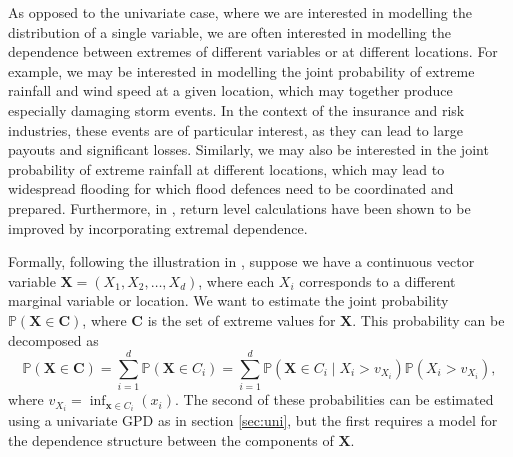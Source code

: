 \documentclass{article}
\numberwithin{equation}{section}
\begin{document}

As opposed to the univariate case, where we are interested in modelling the distribution of a single variable, we are often interested in modelling the dependence between extremes of different variables or at different locations.
For example, we may be interested in modelling the joint probability of extreme rainfall and wind speed at a given location, which may together produce especially damaging storm events.
In the context of the insurance and risk industries, these events are of particular interest, as they can lead to large payouts and significant losses.
Similarly, we may also be interested in the joint probability of extreme rainfall at different locations, which may lead to widespread flooding for which flood defences need to be coordinated and prepared.
Furthermore, in \cite{Zhang2024}, return level calculations have been shown to be improved by incorporating extremal dependence.

Formally, following the illustration in \cite{Heffernan2004}, suppose we have a continuous vector variable $\bm{X} = (X_1, X_2, \ldots, X_d)$, where each $X_i$ corresponds to a different marginal variable or location.
We want to estimate the joint probability $\mathbb{P}(\bm{X} \in \bm{C})$, where $\bm{C}$ is the set of extreme values for $\bm{X}$.
This probability can be decomposed as
\begin{equation} \label{eq:decomp}
  \mathbb{P}(\bm{X} \in \bm{C}) = \sum_{i=1}^{d}{\mathbb{P}(\bm{X} \in C_i)} = \sum_{i=1}^{d}{\mathbb{P}(\bm{X} \in C_i \mid X_i > v_{X_i}) \mathbb{P}(X_i > v_{X_i})},
\end{equation}
where $v_{X_i} = \inf_{\bm{x} \in C_i}(x_i)$.
The second of these probabilities can be estimated using a univariate GPD as in section \ref{sec:uni}, but the first requires a model for the dependence structure between the components of $\bm{X}$.
\end{document}
